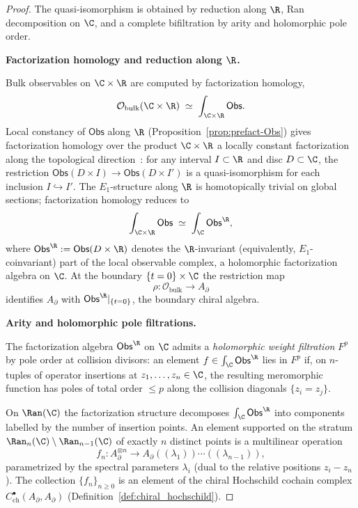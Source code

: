 \begin{proof}
The quasi-isomorphism is obtained by reduction along \(\R\), Ran
decomposition on \(\C\), and a complete bifiltration by arity and
holomorphic pole order.

\medskip
\textbf{Factorization homology and reduction along \(\R\).}

Bulk observables on $\C \times \R$ are computed by factorization homology,
\begin{equation}
\label{eq:bulk-fact-hom}
\mathcal{O}_{\mathrm{bulk}}(\C \times \R) \;\simeq\; \int_{\C \times \R} \mathsf{Obs}.
\end{equation}
Local constancy of $\mathsf{Obs}$ along $\R$ (Proposition~\ref{prop:prefact-Obs}) gives factorization homology over the product $\C \times \R$ a locally constant factorization along the topological direction~\cite{AF15}: for any interval $I \subset \R$ and disc $D \subset \C$, the restriction $\mathsf{Obs}(D \times I) \to \mathsf{Obs}(D \times I')$ is a quasi-isomorphism for each inclusion $I \hookrightarrow I'$. The $E_1$-structure along $\R$ is homotopically trivial on global sections; factorization homology reduces to
\begin{equation}
\label{eq:R-reduction}
\int_{\C \times \R} \mathsf{Obs} \;\simeq\; \int_{\C} \mathsf{Obs}^{\R},
\end{equation}
where $\mathsf{Obs}^{\R} := \mathsf{Obs}(D \times \R)$ denotes the $\R$-invariant (equivalently, $E_1$-coinvariant) part of the local observable complex, a holomorphic factorization algebra on $\C$. At the boundary $\{t = 0\} \times \C$ the restriction map
\begin{equation}
\rho : \mathcal{O}_{\mathrm{bulk}} \longrightarrow A_{\partial}
\end{equation}
identifies $A_{\partial}$ with $\mathsf{Obs}^{\R}|_{\{t=0\}}$, the boundary chiral algebra.

\medskip
\textbf{Arity and holomorphic pole filtrations.}

The factorization algebra $\mathsf{Obs}^{\R}$ on $\C$ admits a \emph{holomorphic weight filtration} $F^p$ by pole order at collision divisors: an element $f \in \int_{\C} \mathsf{Obs}^{\R}$ lies in $F^p$ if, on $n$-tuples of operator insertions at $z_1, \ldots, z_n \in \C$, the resulting meromorphic function has poles of total order $\le p$ along the collision diagonals $\{z_i = z_j\}$.

On $\Ran(\C)$ the factorization structure decomposes $\int_{\C} \mathsf{Obs}^{\R}$ into components labelled by the number of insertion points. An element supported on the stratum $\Ran_n(\C) \setminus \Ran_{n-1}(\C)$ of exactly $n$ distinct points is a multilinear operation
\begin{equation}
\label{eq:Ran-component}
f_n : A_{\partial}^{\otimes n} \longrightarrow A_{\partial}((\lambda_1)) \cdots ((\lambda_{n-1})),
\end{equation}
parametrized by the spectral parameters $\lambda_i$ (dual to the relative positions $z_i - z_n$). The collection $\{f_n\}_{n \geq 0}$ is an element of the chiral Hochschild cochain complex $C^\bullet_{\mathrm{ch}}(A_{\partial}, A_{\partial})$ (Definition~\ref{def:chiral_hochschild}).


\end{proof}
